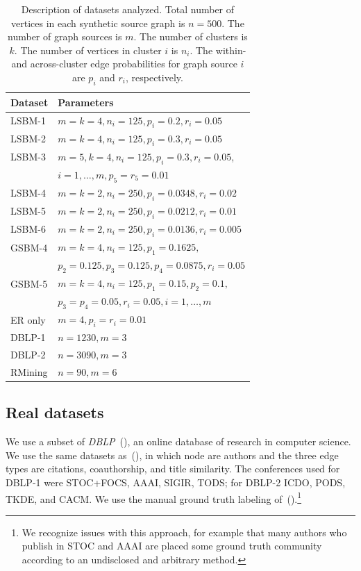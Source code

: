 \documentclass{article}
\begin{document}
\begin{table}
\begin{tabular}{| l | l |}
\hline
Dataset & Parameters\\
\hline 
\hline
LSBM-1  &  $m=k=4, n_i=125, p_i=0.2, r_i=0.05$ \\
LSBM-2  &  $m=k=4, n_i=125, p_i=0.3, r_i=0.05$ \\
LSBM-3  &  $m=5,k=4, n_i=125, p_i=0.3, r_i=0.05$, \\ 
        &  $i = 1, \dots, m, p_5= r_5 = 0.01$ \\
LSBM-4  &  $m=k=2, n_i=250, p_i=0.0348, r_i=0.02$ \\
LSBM-5  &  $m=k=2, n_i=250, p_i=0.0212, r_i=0.01$ \\
LSBM-6  &  $m=k=2, n_i=250, p_i=0.0136, r_i=0.005$ \\
\hline
GSBM-4  &  $m =k= 4, n_i=125, p_1=0.1625, $ \\ 
        &  $p_2 = 0.125, p_3 = 0.125, p_4 = 0.0875, r_i = 0.05$ \\
       
GSBM-5  &  $m=k=4, n_i=125, p_1=0.15, p_2=0.1,$ \\ 
        &  $p_3=p_4=0.05, r_i = 0.05, i=1, \ldots, m$ \\

\hline
ER only &  $m=4, p_i=r_i=0.01$ \\
DBLP-1  &  $n = 1230, m = 3$ \\
DBLP-2  &  $n = 3090, m = 3$ \\
RMining &  $n = 90, m = 6$ \\
\hline
\end{tabular}
\caption{Description of datasets analyzed. Total number of vertices in each
synthetic source graph is $n=500$. The number of graph sources is $m$. The
number of clusters is $k$. The number of vertices in cluster $i$ is $n_i$. 
The within- and across-cluster edge probabilities for graph source $i$ are
$p_i$ and $r_i$, respectively.}
\label{datasets}
\end{table}


\subsection{Real datasets} 
We use a subset of \emph{DBLP}~(\cite{Ley02}), an online database of research in
computer science. We use the same datasets as~(\cite{Papalexakis2013}), in
which node are authors and the three edge types are citations, coauthorship,
and title similarity. The conferences used for DBLP-1 were STOC+FOCS, AAAI,
SIGIR, TODS; for DBLP-2 ICDO, PODS, TKDE, and CACM. We use the manual ground
truth labeling of~(\cite{Papalexakis2013}).\footnote{We recognize issues with this
approach, for example that many authors who publish in STOC and AAAI are placed
some ground truth community according to an undisclosed and arbitrary method.} 
\end{document}
